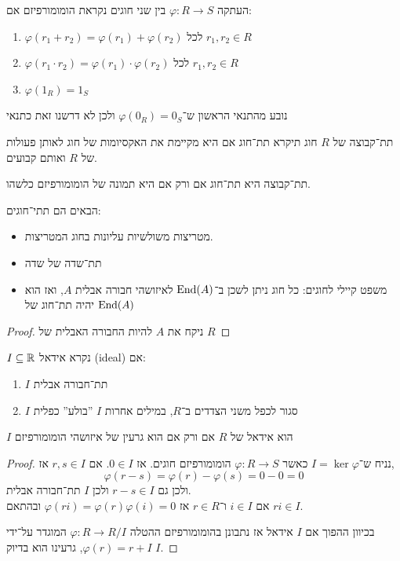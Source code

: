 \begin{definition}
	העתקה $\varphi : R \to S$ בין שני חוגים נקראת הומומורפיזם אם:
	\begin{enumerate}
		\item $\varphi(r_1 + r_2) = \varphi(r_1) + \varphi(r_2)$ לכל $r_1, r_2 \in R$
		\item $\varphi(r_1 \cdot r_2) = \varphi(r_1) \cdot \varphi(r_2)$ לכל $r_1, r_2 \in R$
		\item $\varphi(1_R) = 1_S$
	\end{enumerate}
\end{definition}
\begin{remark}
	נובע מהתנאי הראשון ש־$\varphi(0_R) = 0_S$ ולכן לא דרשנו זאת כתנאי
\end{remark}
\begin{definition}[תת־חוג]
	תת־קבוצה של $R$ חוג תיקרא תת־חוג אם היא מקיימת את האקסיומות של חוג לאותן פעולות של $R$ ואותם קבועים.
\end{definition}
\begin{remark}
	תת־קבוצה היא תת־חוג אם ורק אם היא תמונה של הומומורפיזם כלשהו.
\end{remark}
\begin{example}
	הבאים הם תתי־חוגים:
	\begin{itemize}
		\item מטריצות משולשיות עליונות בחוג המטריצות.
		\item תת־שדה של שדה
		\item משפט קיילי לחוגים:
			כל חוג ניתן לשכן ב־$\operatorname{End}(A)$ לאיזושהי חבורה אבלית $A$, ואז הוא יהיה תת־חוג של $\operatorname{End}(A)$
	\end{itemize}
\end{example}
\begin{proof}
	ניקח את $A$ להיות החבורה האבלית של $R$
\end{proof}
\begin{definition}[אידאל]
	$I \subseteq \mathbb{R}$ נקרא אידאל (ideal) אם:
	\begin{enumerate}
		\item $I$ תת־חבורה אבלית
		\item $I$ סגור לכפל משני הצדדים ב־$R$, במילים אחרות $I$ ''בולע'' כפלית
	\end{enumerate}
\end{definition}
\begin{remark}
	$I$ הוא אידאל של $R$ אם ורק אם הוא גרעין של איזושהי הומומורפיזם
\end{remark}
\begin{proof}
	נניח ש־$I = \ker \varphi$ כאשר $\varphi : R \to S$ הומומורפיזם חוגים.
	אז $0 \in I$.
	אם $r, s \in I$ אז,
	\[
		\varphi(r - s)
		= \varphi(r) - \varphi(s)
		= 0 - 0
		= 0
	\]
	ולכן גם $r - s \in I$ ולכן $I$ תת־חבורה אבלית. \\
	אם $i \in I$ ו־$r \in R$ אז $\varphi(r i) = \varphi(r) \varphi(i) = 0$ ובהתאם $r i \in I$.

	בכיוון ההפוך אם $I$ אידאל אז נתבונן בהומומורפיזם ההטלה $\varphi : R \to R / I$ המוגדר על־ידי $\varphi(r) = r + I$, גרעינו הוא בדיוק $I$.
\end{proof}
